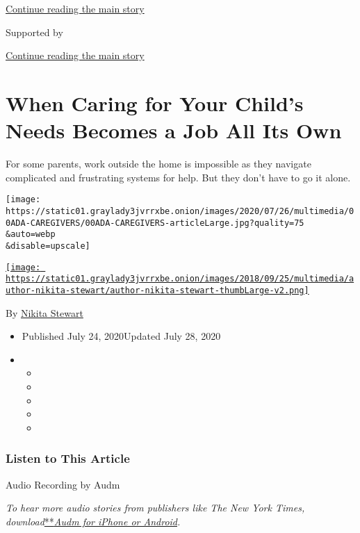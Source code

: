 \protect\hyperlink{after-top}{Continue reading the main story}

Supported by

\protect\hyperlink{after-sponsor}{Continue reading the main story}

\hypertarget{when-caring-for-your-childs-needs-becomes-a-job-all-its-own}{%
\section{When Caring for Your Child's Needs Becomes a Job All Its
Own}\label{when-caring-for-your-childs-needs-becomes-a-job-all-its-own}}

For some parents, work outside the home is impossible as they navigate
complicated and frustrating systems for help. But they don't have to go
it alone.

\texttt{[image: https://static01.graylady3jvrrxbe.onion/images/2020/07/26/multimedia/00ADA-CAREGIVERS/00ADA-CAREGIVERS-articleLarge.jpg?quality=75\\\&auto=webp\\\&disable=upscale]}

\href{https://www.nytimes3xbfgragh.onion/by/nikita-stewart}{\texttt{[image: https://static01.graylady3jvrrxbe.onion/images/2018/09/25/multimedia/author-nikita-stewart/author-nikita-stewart-thumbLarge-v2.png]}}

By \href{https://www.nytimes3xbfgragh.onion/by/nikita-stewart}{Nikita
Stewart}

\begin{itemize}
\item
  Published July 24, 2020Updated July 28, 2020
\item
  \begin{itemize}
  \item
  \item
  \item
  \item
  \item
  \end{itemize}
\end{itemize}

\hypertarget{listen-to-this-article}{%
\subsubsection{Listen to This Article}\label{listen-to-this-article}}

Audio Recording by Audm

\emph{To hear more audio stories from publishers like The New York
Times,
download}\href{https://www.audm.com/?utm_source=nytmag\&utm_medium=embed\&utm_campaign=left_behind_draper}{**}\href{https://www.audm.com/?utm_source=nyt\&utm_medium=embed\&utm_campaign=caring_child_job}{\emph{Audm
for iPhone or Android}}\emph{.}

